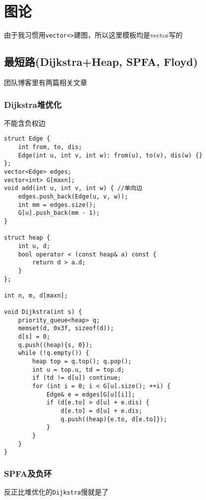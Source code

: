 \documentclass[UTF8]{ctexart}
\begin{document}
\section{图论}

由于我习惯用\texttt{vector<>}建图，所以这里模板均是vector写的

\subsection{最短路(Dijkstra+Heap, SPFA, Floyd)}

团队博客里有两篇相关文章

\subsubsection{Dijkstra堆优化}

不能含负权边

\begin{lstlisting}
struct Edge {
    int from, to, dis;
    Edge(int u, int v, int w): from(u), to(v), dis(w) {}
};
vector<Edge> edges;
vector<int> G[maxn];
void add(int u, int v, int w) { //单向边
    edges.push_back(Edge(u, v, w));
    int mm = edges.size();
    G[u].push_back(mm - 1);
}

struct heap {
    int u, d;
    bool operator < (const heap& a) const {
        return d > a.d;
    }
};

int n, m, d[maxn];

void Dijkstra(int s) {
    priority_queue<heap> q;
    memset(d, 0x3f, sizeof(d));
    d[s] = 0;
    q.push((heap){s, 0});
    while (!q.empty()) {
        heap top = q.top(); q.pop();
        int u = top.u, td = top.d;
        if (td != d[u]) continue;
        for (int i = 0; i < G[u].size(); ++i) {
            Edge& e = edges[G[u][i]];
            if (d[e.to] > d[u] + e.dis) {
                d[e.to] = d[u] + e.dis;
                q.push((heap){e.to, d[e.to]});
            }
        }
    }
}
\end{lstlisting}

\subsubsection{SPFA及负环}

反正比堆优化的\texttt{Dijkstra}慢就是了
\end{document}
